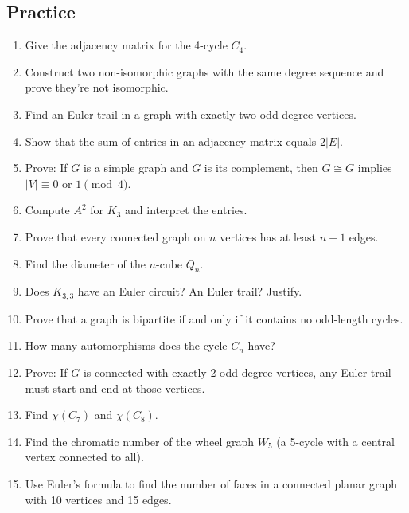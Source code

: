 \subsection*{Practice}
\begin{enumerate}
  \item Give the adjacency matrix for the 4-cycle $C_4$.

  \item Construct two non-isomorphic graphs with the same degree sequence and prove they're not isomorphic.

  \item Find an Euler trail in a graph with exactly two odd-degree vertices.

  \item Show that the sum of entries in an adjacency matrix equals $2|E|$.

  \item Prove: If $G$ is a simple graph and $\overline{G}$ is its complement, then $G \cong \overline{G}$ implies $|V| \equiv 0$ or $1 \pmod 4$.

  \item Compute $A^2$ for $K_3$ and interpret the entries.

  \item Prove that every connected graph on $n$ vertices has at least $n-1$ edges.

  \item Find the diameter of the $n$-cube $Q_n$.

  \item Does $K_{3,3}$ have an Euler circuit? An Euler trail? Justify.

  \item Prove that a graph is bipartite if and only if it contains no odd-length cycles.

  \item How many automorphisms does the cycle $C_n$ have?

  \item Prove: If $G$ is connected with exactly 2 odd-degree vertices, any Euler trail must start and end at those vertices.

  \item Find $\chi(C_7)$ and $\chi(C_8)$.

  \item Find the chromatic number of the wheel graph $W_5$ (a 5-cycle with a central vertex connected to all).

  \item Use Euler's formula to find the number of faces in a connected planar graph with 10 vertices and 15 edges.


\end{enumerate}
